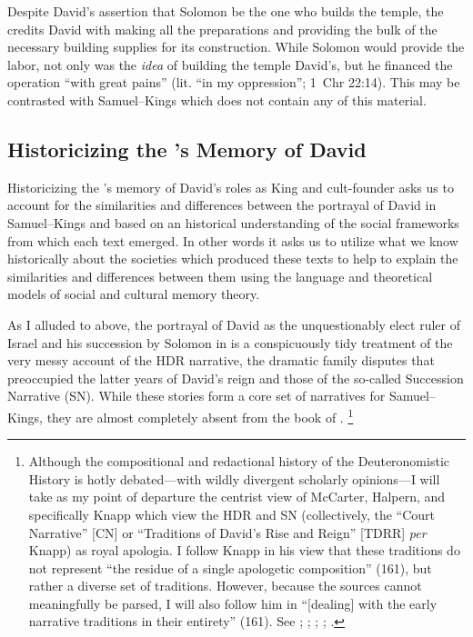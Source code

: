 Despite David's assertion that Solomon be the one who builds the temple, the \chronicler credits David with making all the preparations and providing the bulk of the necessary building supplies for its construction. 
While Solomon would provide the labor, not only was the \emph{idea} of building the temple David's, but he financed the operation  ``with great pains'' (lit. ``in my oppression''; 1~Chr 22:14). This may be contrasted with Samuel--Kings which does not contain any of this material. 

\subsection{Historicizing the \chronicler's Memory of David}

Historicizing the \chronicler's memory of David's roles as King and cult-founder asks us to account for the similarities and differences between the portrayal of David in Samuel--Kings and \chronicles based on an historical understanding of the social frameworks from which each text emerged. In other words it asks us to utilize what we know historically about the societies which produced these texts to help to explain the similarities and differences between them using the language and theoretical models of social and cultural memory theory.

As I alluded to above, the portrayal of David as the unquestionably elect ruler of Israel and his succession by Solomon in \chronicles is a conspicuously tidy treatment of the very messy account of the HDR narrative, the dramatic family disputes that preoccupied the latter years of David's reign and those of the so-called Succession Narrative (SN). While these stories form a core set of narratives for Samuel--Kings, they are almost completely absent from the book of \chronicles.%
    \footnote{Although the compositional and redactional history of the Deuteronomistic History is hotly debated---with wildly divergent scholarly opinions---I will take as my point of departure the centrist view of McCarter, Halpern, and specifically Knapp which view the HDR and SN (collectively, the ``Court Narrative'' [CN] or ``Traditions of David's Rise and Reign'' [TDRR] \emph{per} Knapp) as royal apologia. I follow Knapp in his view that these traditions do not represent ``the residue of a single apologetic composition'' (161), but rather a diverse set of traditions. However, because the sources cannot meaningfully be parsed, I will also follow him in ``[dealing] with the early narrative traditions in their entirety'' (161). See 
        \cite{knapp2015};
        \cite{mccarter_interpretation1981};
        \cite{mccarter_jbl1980};
        \cite{mccarter1980};
        \cite{halpern2001}.}

